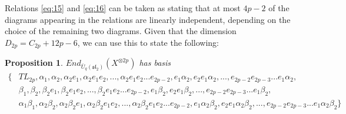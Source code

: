 \documentclass[]{article}
\newtheorem{prop}{Proposition}[section]
\begin{document}
Relations \ref{eq:15} and \ref{eq:16} can be taken as stating that at most $4p-2$ of the diagrams appearing in the relations are linearly independent, depending on the choice of the remaining two diagrams. Given that the dimension $D_{2p}=C_{2p}+12p-6$, we can use this to state the following:
\begin{prop}
$End_{\bar{U}_{q}(\mathfrak{sl}_{2})}(X^{\otimes 2p})$ has basis
\begin{align*}
\{&TL_{2p},\alpha_{1},\alpha_{2},\alpha_{2}e_{1},\alpha_{2}e_{1}e_{2},...,\alpha_{2}e_{1}e_{2}...e_{2p-2},e_{1}\alpha_{2},e_{2}e_{1}\alpha_{2},...,e_{2p-2}e_{2p-3}...e_{1}\alpha_{2},\\
&\beta_{1},\beta_{2},\beta_{2}e_{1},\beta_{2}e_{1}e_{2},...,\beta_{2}e_{1}e_{2}...e_{2p-2},e_{1}\beta_{2},e_{2}e_{1}\beta_{2},...,e_{2p-2}e_{2p-3}...e_{1}\beta_{2},\\
&\alpha_{1}\beta_{1},\alpha_{2}\beta_{2},\alpha_{2}\beta_{2}e_{1},\alpha_{2}\beta_{2}e_{1}e_{2},...,\alpha_{2}\beta_{2}e_{1}e_{2}...e_{2p-2},e_{1}\alpha_{2}\beta_{2},e_{2}e_{1}\alpha_{2}\beta_{2},...,e_{2p-2}e_{2p-3}...e_{1}\alpha_{2}\beta_{2}\}
\end{align*}
\end{prop}
\end{document}
